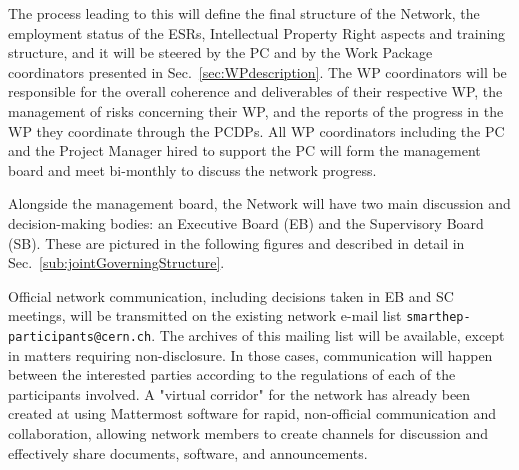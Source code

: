 The process leading to this will define the final structure of the Network, the employment status of the ESRs, Intellectual Property Right aspects and training structure, and it
will be steered by the PC and by the Work Package coordinators presented in Sec.~\ref{sec:WPdescription}.%
The WP coordinators will be responsible for the overall coherence and deliverables of their respective WP, the management of risks concerning their WP, and the reports of the progress in the WP they coordinate through the PCDPs. 
All WP coordinators including the PC and the Project Manager hired to support the PC will form the \acronym management board and meet bi-monthly to discuss the network progress. 

Alongside the management board, the Network will have two main discussion and decision-making bodies: an Executive Board (EB) and the Supervisory Board (SB).
These are pictured in the following figures and described in detail in Sec.~\ref{sub:jointGoverningStructure}. 


Official network communication, including decisions taken in EB and SC meetings, will be transmitted on the
existing network e-mail list \texttt{smarthep-participants@cern.ch}. The archives of this mailing list will be available, except in matters requiring non-disclosure. 
In those cases, communication will happen between %
the interested parties according to the regulations of each of the participants involved. 
A "virtual corridor" for the network has already been created at \cern using Mattermost software for rapid, non-official communication and collaboration,
allowing network members to create channels for discussion and effectively share documents, software, and announcements.

